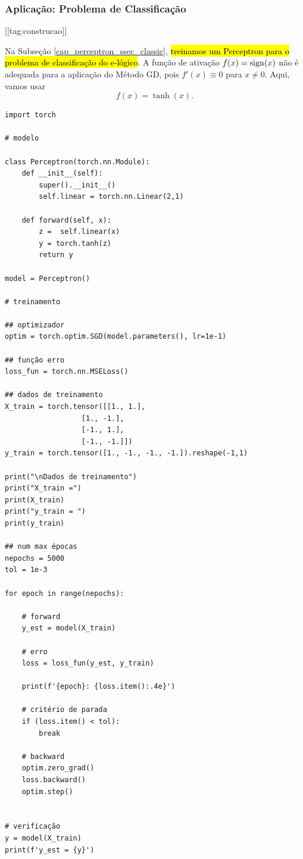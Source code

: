 \subsubsection{Aplicação: Problema de Classificação}
[[tag:construcao]]

Na Subseção \ref{cap_perceptron_ssec_classic}, \hl{treinamos um Perceptron para o problema de classificação do e-lógico}. A função de ativação $f(x) = \operatorname{sign}(x)$ não é adequada para a aplicação do Método GD, pois $f'(x) \equiv 0$ para $x\neq 0$. Aqui, vamos usar
\begin{equation}
  f(x) = \tanh(x).
\end{equation}

% 
\begin{lstlisting}[caption=perceptron\_gd.py, label=cap_perceptron_sec_train:cod:perceptron_gd]
import torch

# modelo

class Perceptron(torch.nn.Module):
    def __init__(self):
        super().__init__()
        self.linear = torch.nn.Linear(2,1)

    def forward(self, x):
        z =  self.linear(x)
        y = torch.tanh(z)
        return y

model = Perceptron()

# treinamento

## optimizador
optim = torch.optim.SGD(model.parameters(), lr=1e-1)

## função erro
loss_fun = torch.nn.MSELoss()

## dados de treinamento
X_train = torch.tensor([[1., 1.],
                  [1., -1.],
                  [-1., 1.],
                  [-1., -1.]])
y_train = torch.tensor([1., -1., -1., -1.]).reshape(-1,1)

print("\nDados de treinamento")
print("X_train =")
print(X_train)
print("y_train = ")
print(y_train)

## num max épocas
nepochs = 5000
tol = 1e-3

for epoch in range(nepochs):

    # forward
    y_est = model(X_train)

    # erro
    loss = loss_fun(y_est, y_train)

    print(f'{epoch}: {loss.item():.4e}')

    # critério de parada
    if (loss.item() < tol):
        break

    # backward
    optim.zero_grad()
    loss.backward()
    optim.step()


# verificação
y = model(X_train)
print(f'y_est = {y}')
\end{lstlisting}

